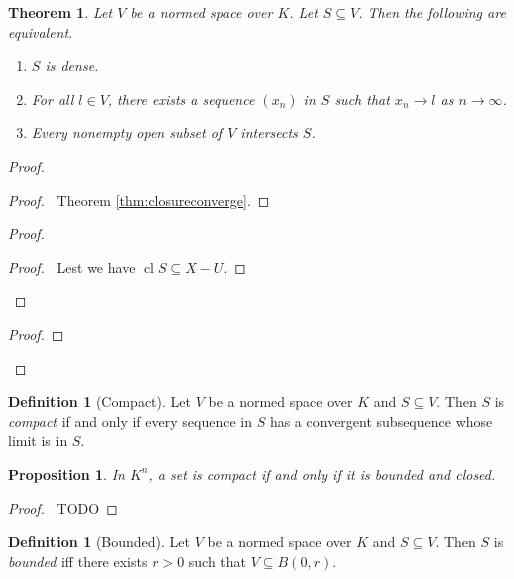 \documentclass{book}
\let\qed\relax
\newtheorem{prop}[ax]{Proposition}
\newtheorem{thm}[ax]{Theorem}
\theoremstyle{definition}
\newtheorem{df}[ax]{Definition}
\newcommand{\cl}{\ensuremath{\operatorname{cl}}}
\begin{document}
\begin{thm}
Let $V$ be a normed space over $K$. Let $S \subseteq V$. Then the following are equivalent.
\begin{enumerate}
\item $S$ is dense.
\item For all $l \in V$, there exists a sequence $(x_n)$ in $S$ such that $x_n \rightarrow l$ as $n \rightarrow \infty$.
\item Every nonempty open subset of $V$ intersects $S$.
\end{enumerate}
\end{thm}

\begin{proof}
\pf
{}
\begin{proof}
	\pf\ Theorem \ref{thm:closureconverge}.
\end{proof}
\begin{proof}
	\begin{proof}
		\pf\ Lest we have $\cl S \subseteq X - U$.
	\end{proof}
\end{proof}
\begin{proof}
	\step{c}{$\cl S = V$}
\end{proof}
\qed
\end{proof}

\begin{df}[Compact]
Let $V$ be a normed space over $K$ and $S \subseteq V$. Then $S$ is \emph{compact} if and only if every sequence in $S$ has a convergent subsequence whose limit is in $S$.
\end{df}

\begin{prop}
In $K^n$, a set is compact if and only if it is bounded and closed.
\end{prop}

\begin{proof}
\pf\ TODO
\end{proof}

\begin{df}[Bounded]
Let $V$ be a normed space over $K$ and $S \subseteq V$. Then $S$ is \emph{bounded} iff there exists $r > 0$ such that $V \subseteq B(0,r)$.
\end{df}
\end{document}
